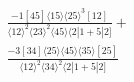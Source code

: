 \documentclass[varwidth, border=5pt]{standalone}
\begin{document}
\begin{my}
$\begin{gathered}
\scriptscriptstyle\frac{-1[45]⟨15⟩⟨25⟩^3[12]}{⟨12⟩^2⟨23⟩^2⟨45⟩⟨2|1+5|2]}+\\
\scriptscriptstyle\frac{-3[34]⟨25⟩⟨45⟩⟨35⟩[25]}{⟨12⟩^2⟨34⟩^2⟨2|1+5|2]}\phantom{+}
\end{gathered}$
\end{my}
\end{document}
